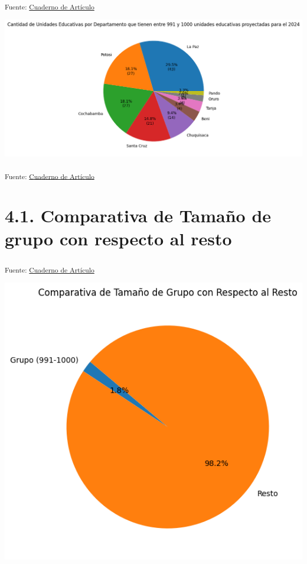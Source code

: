 \documentclass[
  12pt]{article}
\begin{document}
\textsubscript{Fuente:
\href{https://sociest.github.io/ue-report/index.ipynb.html}{Cuaderno de
Artículo}}

\includegraphics{index_files/figure-pdf/cell-20-output-1.png}

\textsubscript{Fuente:
\href{https://sociest.github.io/ue-report/index.ipynb.html}{Cuaderno de
Artículo}}

\section{4.1. Comparativa de Tamaño de grupo con respecto al
resto}\label{comparativa-de-tamauxf1o-de-grupo-con-respecto-al-resto}

\textsubscript{Fuente:
\href{https://sociest.github.io/ue-report/index.ipynb.html}{Cuaderno de
Artículo}}

\includegraphics{index_files/figure-pdf/cell-21-output-1.png}
\end{document}
